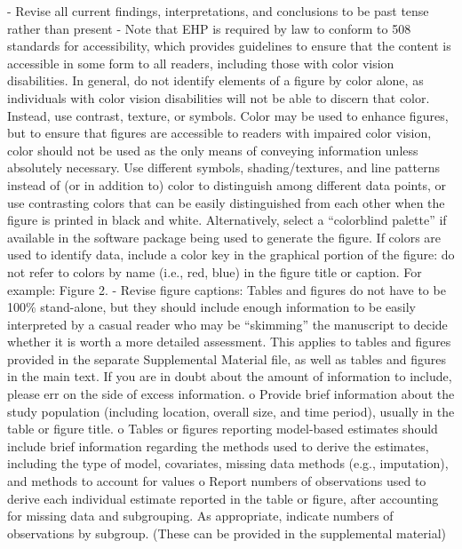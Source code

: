 - Revise all current findings, interpretations, and conclusions to be past tense rather than present
- Note that EHP is required by law to conform to 508 standards for accessibility, which provides guidelines to ensure that the content is accessible in some form to all readers, including those with color vision disabilities. In general, do not identify elements of a figure by color alone, as individuals with color vision disabilities will not be able to discern that color. Instead, use contrast, texture, or symbols. Color may be used to enhance figures, but to ensure that figures are accessible to readers with impaired color vision, color should not be used as the only means of conveying information unless absolutely necessary. Use different symbols, shading/textures, and line patterns instead of (or in addition to) color to distinguish among different data points, or use contrasting colors that can be easily distinguished from each other when the figure is printed in black and white. Alternatively, select a “colorblind palette” if available in the software package being used to generate the figure. If colors are used to identify data, include a color key in the graphical portion of the figure: do not refer to colors by name (i.e., red, blue) in the figure title or caption. For example: Figure 2.
- Revise figure captions: Tables and figures do not have to be 100\% stand-alone, but they should include enough information to be easily interpreted by a casual reader who may be “skimming” the manuscript to decide whether it is worth a more detailed assessment. This applies to tables and figures provided in the separate Supplemental Material file, as well as tables and figures in the main text. If you are in doubt about the amount of information to include, please err on the side of excess information.
o Provide brief information about the study population (including location, overall size, and time period), usually in the table or figure title.
o Tables or figures reporting model-based estimates should include brief information regarding the methods used to derive the estimates, including the type of model, covariates, missing data methods (e.g., imputation), and methods to account for values o Report numbers of observations used to derive each individual estimate reported in the table or figure, after accounting for missing data and subgrouping. As appropriate, indicate numbers of observations by subgroup. (These can be provided in the supplemental material)